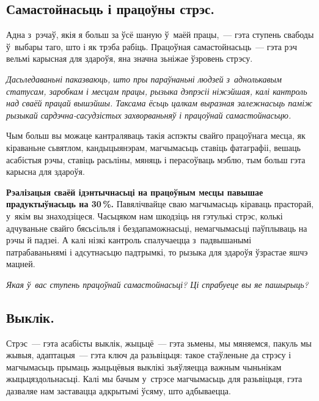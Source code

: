 
\subsection*{Самастойнасьць і працоўны стрэс.}

Адна з~рэчаў, якія я больш за ўсё шаную ў~маёй працы,~--- гэта ступень свабоды ў~выбары таго, што і як трэба рабіць. Працоўная самастойнасьць~--- гэта рэч вельмі карысная для здароўя, яна значна зьніжае ўзровень стрэсу. 

\emph{Дасьледаваньні паказваюць, што пры параўнаньні людзей з~аднолькавым статусам, заробкам і месцам працы, рызыка дэпрэсіі ніжэйшая, калі кантроль над сваёй працай вышэйшы. Таксама ёсьць цалкам выразная залежнасьць паміж рызыкай сардэчна-сасудзістых захворваньняў і працоўнай самастойнасьцю.}

Чым больш вы можаце кантраляваць такія аспэкты свайго працоўнага месца, як кіраваньне сьвятлом, кандыцыянэрам, магчымасьць ставіць фатаграфіі, вешаць асабістыя рэчы, ставіць расьліны, мяняць і перасоўваць мэблю, тым больш гэта карысна для здароўя. 

\textbf{Рэалізацыя сваёй ідэнтычнасьці на працоўным месцы павышае прадуктыўнасьць на 30\,\%.} Павялічвайце сваю магчымасьць кіраваць прасторай, у~якім вы знаходзіцеся. Часьцяком нам шкодзіць ня гэтулькі стрэс, колькі адчуваньне свайго бясьсільля і бездапаможнасьці, немагчымасьці паўплываць на рэчы й падзеі. А калі нізкі кантроль спалучаецца з~падвышанымі патрабаваньнямі і адсутнасьцю падтрымкі, то рызыка для здароўя ўзрастае яшчэ мацней.

\emph{Якая ў~вас ступень працоўнай самастойнасьці? Ці спрабуеце вы яе пашырыць?}

\subsection*{Выклік.}

Стрэс~--- гэта асабісты выклік, жыцьцё~--- гэта зьмены, мы мяняемся, пакуль мы жывыя, адаптацыя~--- гэта ключ да разьвіцьця: такое стаўленьне да стрэсу і магчымасьць прымаць жыцьцёвыя выклікі зьяўляецца важным чыньнікам жыцьцяздольнасьці. Калі мы бачым у~стрэсе магчымасьць для разьвіцьця, гэта дазваляе нам заставацца адкрытымі ўсяму, што адбываецца.

